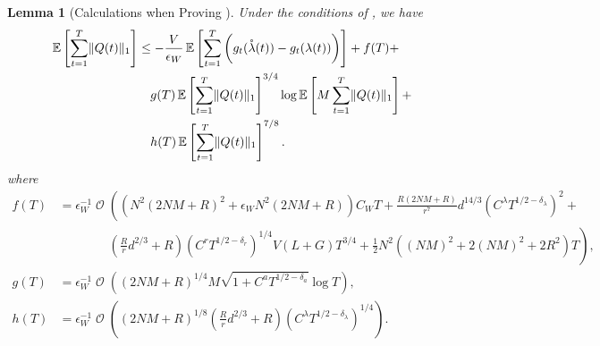 \documentclass[11pt,fullpage,letterpaper]{article} %
\newtheorem{lemma}[theorem]{Lemma}
\renewcommand{\bm}[1]{#1}%
\renewcommand{\O}{\operatorname{\mathcal O}}
\newcommand{\E}{\operatornamewithlimits{\mathbb{E}}}
\begin{document}
\begin{lemma}[Calculations when Proving ]\label{lem:multi-hop utility tedious calc}
Under the conditions of , we have
\begin{align*}
\E\left [\sum_{t=1}^T \lVert \bm Q(t)\rVert_1\right ]&\le -\frac{V}{\epsilon_W} \E\left [\sum_{t=1}^T \bigg (g_t(\mathring{\bm \lambda}(t)) - g_t(\bm \lambda(t))\bigg )\right ] + f(T) + \\
&\quad g(T) \E\left [\sum_{t=1}^T \lVert \bm Q(t)\rVert_1\right ]^{3/4} \log \E\left [M \sum_{t=1}^T \lVert \bm Q(t)\rVert_1\right ] + \\
&\quad h(T) \E\left [\sum_{t=1}^T \lVert \bm Q(t)\rVert_1\right ]^{7/8}.
\end{align*}
where
\begin{align*}
f(T)&= \epsilon_W^{-1} \O\left ((N^2 (2NM+R)^2 + \epsilon_W N^2 (2NM+R)) C_W T + \frac{R(2NM+R)}{r^7} d^{14/3} (C^\lambda T^{1/2 - \delta_\lambda})^2\right .+\\
&\qquad \qquad \left .\left (\frac{R}{r} d^{2/3}+R\right ) (C^r T^{1/2 - \delta_r})^{1/4} V(L+G) T^{3/4}+\frac 12 N^2 ((NM)^2+2(NM)^2+2R^2) T\right ),\\
g(T)&=\epsilon_W^{-1} \O\left ((2NM+R)^{1/4} M \sqrt{1+C^a T^{1/2 - \delta_a}} \log T \right ), \\
h(T)&=\epsilon_W^{-1} \O\left ((2NM+R)^{1/8} \left (\frac Rr d^{2/3} + R\right ) (C^\lambda T^{1/2 - \delta_\lambda})^{1/4}\right ).
\end{align*}
\end{lemma}
\end{document}
